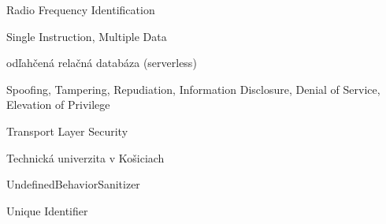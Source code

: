 \documentclass[]{tukediphc}
\begin{document}
\begin{description}[style=nextline,leftmargin=3cm,labelwidth=2.8cm]
\item[RFID] Radio Frequency Identification
\item[SIMD] Single Instruction, Multiple Data
\item[SQLite] odľahčená relačná databáza (serverless)
\item[STRIDE] Spoofing, Tampering, Repudiation, Information Disclosure, Denial of Service, Elevation of Privilege
\item[TLS] Transport Layer Security
\item[TUKE] Technická univerzita v Košiciach
\item[UBSan] UndefinedBehaviorSanitizer
\item[UID] Unique Identifier
\end{description}

\kslovnikterminov
%

%

%

%

%

%

%

%
\protect\label{page:posledna}
\end{document}
